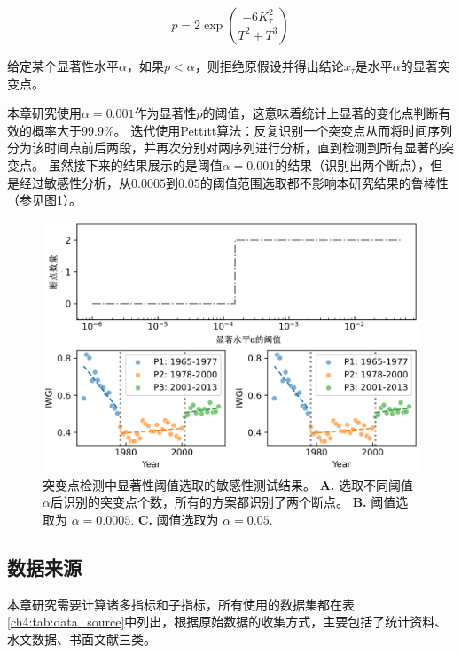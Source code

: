 \begin{equation}
    p=2 \exp \left(\frac{-6 K_{\tau}^{2}}{T^{2}+T^{3}}\right)
\end{equation}

给定某个显著性水平$\alpha$，如果$p < \alpha$，则拒绝原假设并得出结论$x_{\tau}$是水平$\alpha$的显著突变点。

本章研究使用$\alpha = 0.001$作为显著性$p$的阈值，这意味着统计上显著的变化点判断有效的概率大于$99.9\%$。
迭代使用Pettitt算法：反复识别一个突变点从而将时间序列分为该时间点前后两段，并再次分别对两序列进行分析，直到检测到所有显著的突变点。
虽然接下来的结果展示的是阈值$\alpha = 0.001$的结果（识别出两个断点），但是经过敏感性分析，从$0.0005$到$0.05$的阈值范围选取都不影响本研究结果的鲁棒性（参见图\ref{ch4:fig:sensitivity}）。

\begin{figure}[!h] %
    \includegraphics[width=\textwidth]{img/ch4/ch4_sensitivity.png}
    \caption[突变点检测中显著性阈值选取的敏感性测试]{突变点检测中显著性阈值选取的敏感性测试结果。
    \textbf{A.} 选取不同阈值$\alpha$后识别的突变点个数，所有的方案都识别了两个断点。
    \textbf{B.} 阈值选取为 $\alpha=0.0005$.
    \textbf{C.} 阈值选取为 $\alpha=0.05$.}\label{ch4:fig:sensitivity}
\end{figure}

\subsection{数据来源}
本章研究需要计算诸多指标和子指标，所有使用的数据集都在表\ref{ch4:tab:data_source}中列出，根据原始数据的收集方式，主要包括了统计资料、水文数据、书面文献三类。

